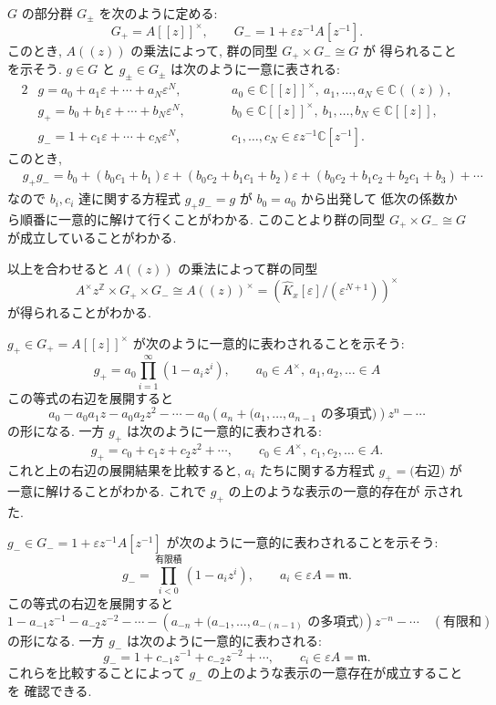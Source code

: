 \documentclass[12pt,twoside]{jarticle}
\newcommand\Z{{\mathbb Z}} %
\newcommand\C{{\mathbb C}} %
\theoremstyle{definition} %
\theoremstyle{definition} %
\theoremstyle{definition} %
\numberwithin{theorem}{section}
\numberwithin{equation}{section}
\numberwithin{figure}{section}
\numberwithin{table}{section}
\newcommand\Khat{{\widehat K}}
\newcommand\eps{\varepsilon}
\newcommand\m{{\mathfrak m}}
\begin{document}
$G$ の部分群 $G_\pm$ を次のように定める:
\[
G_+ = A[[z]]^\times, \qquad
G_- = 1+\eps z^{-1}A[z^{-1}].
\]
このとき, $A((z))$ の乗法によって, 群の同型 $G_+\times G_-\cong G$ が
得られることを示そう. 
$g\in G$ と $g_\pm\in G_\pm$ は次のように一意に表される:
\begin{alignat*}{2}
&
g = a_0+a_1\eps+\cdots+a_N\eps^N, \qquad
& &
a_0\in \C[[z]]^\times,\ a_1,\ldots,a_N\in\C((z)), 
\\ &
g_+ = b_0+b_1\eps+\cdots+b_N\eps^N, \qquad
& &
b_0\in\C[[z]]^\times,\ b_1,\ldots,b_N\in\C[[z]],
\\ &
g_- = 1+c_1\eps+\cdots+c_N\eps^N, \qquad
& &
c_1,\ldots,c_N\in\eps z^{-1}\C[z^{-1}].
\end{alignat*}
このとき,
\begin{align*}
&
g_+g_- 
= b_0 + (b_0c_1+b_1)\eps + (b_0c_2+b_1c_1+b_2)\eps
+ (b_0c_2+b_1c_2+b_2c_1+b_3)+\cdots
\end{align*}
なので $b_i,c_i$ 達に関する方程式 $g_+g_-=g$ が $b_0=a_0$ から出発して
低次の係数から順番に一意的に解けて行くことがわかる.
このことより群の同型 $G_+\times G_-\cong G$ が成立していることがわかる.

以上を合わせると $A((z))$ の乗法によって群の同型
\[
 A^\times z^\Z\times G_+\times G_- \cong A((z))^\times 
= \left(\Khat_x[\eps]/(\eps^{N+1})\right)^\times
\]
が得られることがわかる.

$g_+\in G_+=A[[z]]^\times$ が次のように一意的に表わされることを示そう:
\[
 g_+ = a_0\prod_{i=1}^\infty(1-a_i z^i), \qquad
 a_0\in A^\times,\ a_1,a_2,\ldots\in A
\]
この等式の右辺を展開すると
\[
a_0 - a_0a_1 z - a_0a_2 z^2 
- \cdots - a_0(a_n + \text{($a_1,\ldots,a_{n-1}$ の多項式)})z^n
- \cdots
\]
の形になる. 一方 $g_+$ は次のように一意的に表わされる:
\[
g_+ = c_0 + c_1 z + c_2 z^2 + \cdots, \qquad
c_0\in A^\times,\ c_1,c_2,\ldots\in A.
\]
これと上の右辺の展開結果を比較すると, $a_i$ たちに関する方程式 $g_+=\text{(右辺)}$ が
一意に解けることがわかる. これで $g_+$ の上のような表示の一意的存在が
示された. 

$g_-\in G_-=1+\eps z^{-1}A[z^{-1}]$ が次のように一意的に表わされることを示そう:
\[
g_- = \prod_{i<0}^{\text{有限積}} (1-a_i z^i), \qquad
a_i\in \eps A=\m.
\]
この等式の右辺を展開すると
\[
1 - a_{-1} z^{-1} - a_{-2} z^{-2} 
- \cdots - (a_{-n} + \text{($a_{-1},\ldots,a_{-(n-1)}$ の多項式)})z^{-n}
- \cdots \quad (\text{有限和})
\]
の形になる. 一方 $g_-$ は次のように一意的に表わされる:
\[
g_-=1+c_{-1}z^{-1}+c_{-2}z^{-2}+\cdots, \qquad
c_i\in\eps A=\m.
\]
これらを比較することによって $g_-$ の上のような表示の一意存在が成立することを
確認できる.
\end{document}

